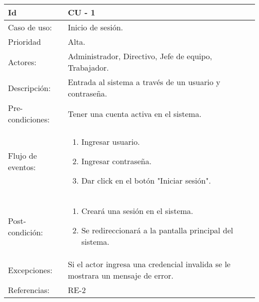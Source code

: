 \documentclass[11pt,a4paper]{article}
\begin{document}
\begin{tabular}[c]{|p{3cm}|p{13cm}|p{2.5cm}|p{3cm}|}
\hline 
\rule[-1ex]{0pt}{2.5ex} Id & CU - 1 \\ 
\hline 
\rule[-1ex]{0pt}{2.5ex} Caso de uso: & Inicio de sesión. \\ 
\hline 
\rule[-1ex]{0pt}{2.5ex} Prioridad & Alta. \\ 
\hline 
\rule[-1ex]{0pt}{2.5ex} Actores: & Administrador, Directivo, Jefe de equipo, Trabajador. \\ 
\hline 
\rule[-1ex]{0pt}{2.5ex} Descripción: & Entrada al sistema a través de un usuario y contraseña.\\ 
\hline 
\rule[-1ex]{0pt}{2.5ex} Pre-condiciones: & Tener una cuenta activa en el sistema. \\ 
\hline 
\rule[-1ex]{0pt}{2.5ex} Flujo de eventos: & \begin{enumerate}
\item Ingresar usuario.
\item Ingresar contraseña.
\item Dar click en el botón "Iniciar sesión".
\end{enumerate} \\ 
\hline 
\rule[-1ex]{0pt}{2.5ex} Post-condición: & \begin{enumerate}
\item Creará una sesión en el sistema.
\item Se redireccionará a la pantalla principal del sistema.
\end{enumerate} \\ 
\hline 
\rule[-1ex]{0pt}{2.5ex} Excepciones: & Si el actor ingresa una credencial invalida se le mostrara un mensaje de error.\\ 
\hline 
\rule[-1ex]{0pt}{2.5ex} Referencias: & RE-2\\ 
\hline 
\end{tabular} 
\\
\end{document}
